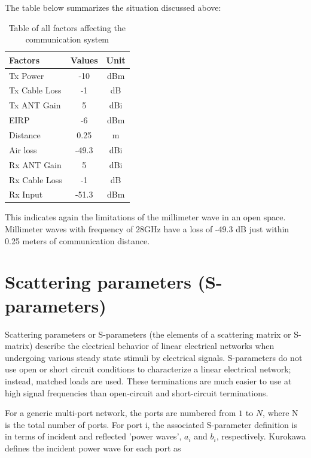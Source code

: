 \documentclass[a4paper,12pt]{report}
\begin{document}
The table below summarizes the situation discussed above:

\begin{table}[h]
  \centering
  \caption{Table of all factors affecting the communication system}
  \label{table:communication_system_factors}
  \begin{tabular}[]{lcc}
    \hline
    Factors & Values & Unit \\
    \hline\hline
    Tx Power & -10 & dBm \\
    \hline
    Tx Cable Loss & -1 & dB \\
    \hline
    Tx ANT Gain & 5 & dBi \\
    \hline
    EIRP & -6 & dBm \\
    \hline
    Distance & 0.25 & m \\
    \hline
    Air loss & -49.3 & dBi \\
    \hline
    Rx ANT Gain & 5 & dBi \\
    \hline
    Rx Cable Loss & -1 & dB \\
    \hline
    \hline
    Rx Input & -51.3 & dBm \\
    \hline
  \end{tabular}
\end{table}

This indicates again the limitations of the millimeter wave in an open space.
Millimeter waves with frequency of 28GHz have a loss of -49.3 dB
just within 0.25 meters of communication distance.

\section{Scattering parameters (S-parameters)}

Scattering parameters or S-parameters
(the elements of a scattering matrix or S-matrix)
describe the electrical behavior of linear electrical networks
when undergoing various steady state stimuli by electrical signals.
S-parameters do not use open or short circuit conditions to
characterize a linear electrical network;
instead, matched loads are used.
These terminations are much easier to use at high signal frequencies
than open-circuit and short-circuit terminations.

For a generic multi-port network, the ports are numbered from $1$ to $N$,
where N is the total number of ports. 
For port i,
the associated S-parameter definition is in terms of
incident and reflected 'power waves',
$a_i$ and $b_i$, respectively.
Kurokawa \cite{1125964} defines the incident power wave for each port as
\end{document}
